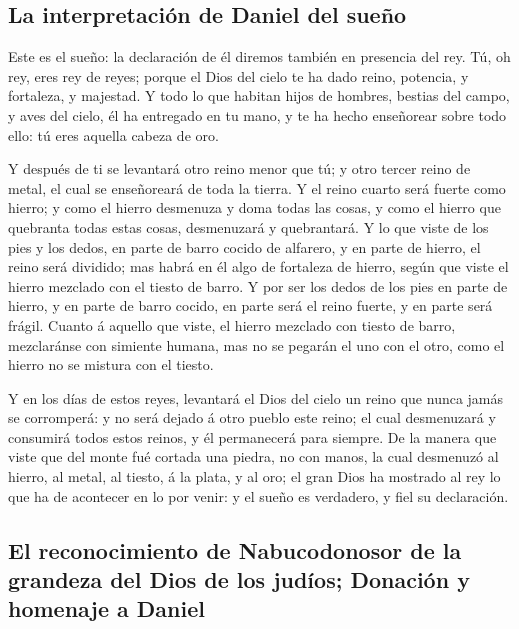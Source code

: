 \hypertarget{la-interpretaciuxf3n-de-daniel-del-sueuxf1o}{%
\subsection{La interpretación de Daniel del
sueño}\label{la-interpretaciuxf3n-de-daniel-del-sueuxf1o}}

 Este es el sueño: la declaración de él diremos también
en presencia del rey.  Tú, oh rey, eres rey de reyes;
porque el Dios del cielo te ha dado reino, potencia, y fortaleza, y
majestad.  Y todo lo que habitan hijos de hombres,
bestias del campo, y aves del cielo, él ha entregado en tu mano, y te ha
hecho enseñorear sobre todo ello: tú eres aquella cabeza de oro.

 Y después de ti se levantará otro reino menor que tú; y
otro tercer reino de metal, el cual se enseñoreará de toda la tierra.
 Y el reino cuarto será fuerte como hierro; y como el
hierro desmenuza y doma todas las cosas, y como el hierro que quebranta
todas estas cosas, desmenuzará y quebrantará.  Y lo que
viste de los pies y los dedos, en parte de barro cocido de alfarero, y
en parte de hierro, el reino será dividido; mas habrá en él algo de
fortaleza de hierro, según que viste el hierro mezclado con el tiesto de
barro.  Y por ser los dedos de los pies en parte de
hierro, y en parte de barro cocido, en parte será el reino fuerte, y en
parte será frágil.  Cuanto á aquello que viste, el hierro
mezclado con tiesto de barro, mezclaránse con simiente humana, mas no se
pegarán el uno con el otro, como el hierro no se mistura con el tiesto.

 Y en los días de estos reyes, levantará el Dios del
cielo un reino que nunca jamás se corromperá: y no será dejado á otro
pueblo este reino; el cual desmenuzará y consumirá todos estos reinos, y
él permanecerá para siempre.  De la manera que viste que
del monte fué cortada una piedra, no con manos, la cual desmenuzó al
hierro, al metal, al tiesto, á la plata, y al oro; el gran Dios ha
mostrado al rey lo que ha de acontecer en lo por venir: y el sueño es
verdadero, y fiel su declaración.

\hypertarget{el-reconocimiento-de-nabucodonosor-de-la-grandeza-del-dios-de-los-juduxedos-donaciuxf3n-y-homenaje-a-daniel}{%
\subsection{El reconocimiento de Nabucodonosor de la grandeza del Dios
de los judíos; Donación y homenaje a
Daniel}\label{el-reconocimiento-de-nabucodonosor-de-la-grandeza-del-dios-de-los-juduxedos-donaciuxf3n-y-homenaje-a-daniel}}

